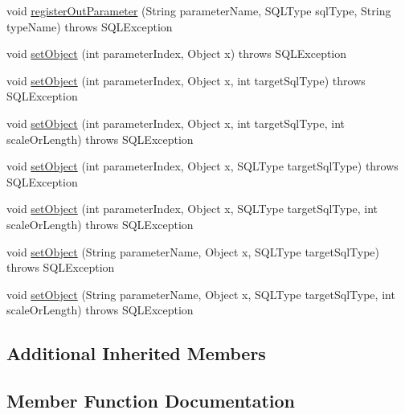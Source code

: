 \begin{DoxyCompactItemize}
\item 
void \mbox{\hyperlink{classcom_1_1mysql_1_1jdbc_1_1_j_d_b_c42_callable_statement_aabab9940d929ca7a5925da2f635a18d5}{register\+Out\+Parameter}} (String parameter\+Name, S\+Q\+L\+Type sql\+Type, String type\+Name)  throws S\+Q\+L\+Exception 
\item 
void \mbox{\hyperlink{classcom_1_1mysql_1_1jdbc_1_1_j_d_b_c42_callable_statement_a163f764b522b400e8e43a08a89d8e990}{set\+Object}} (int parameter\+Index, Object x)  throws S\+Q\+L\+Exception 
\item 
void \mbox{\hyperlink{classcom_1_1mysql_1_1jdbc_1_1_j_d_b_c42_callable_statement_ad1e1aea3f13d37fcd332e13a945f8bef}{set\+Object}} (int parameter\+Index, Object x, int target\+Sql\+Type)  throws S\+Q\+L\+Exception 
\item 
void \mbox{\hyperlink{classcom_1_1mysql_1_1jdbc_1_1_j_d_b_c42_callable_statement_a14c7b57ffb7ac7f89a51a70abdece688}{set\+Object}} (int parameter\+Index, Object x, int target\+Sql\+Type, int scale\+Or\+Length)  throws S\+Q\+L\+Exception 
\item 
void \mbox{\hyperlink{classcom_1_1mysql_1_1jdbc_1_1_j_d_b_c42_callable_statement_a7665e336f090f055b64c0b1925e9dde0}{set\+Object}} (int parameter\+Index, Object x, S\+Q\+L\+Type target\+Sql\+Type)  throws S\+Q\+L\+Exception 
\item 
void \mbox{\hyperlink{classcom_1_1mysql_1_1jdbc_1_1_j_d_b_c42_callable_statement_a3a5d6f49e57dd9a3c7c19d95e9ec2bb9}{set\+Object}} (int parameter\+Index, Object x, S\+Q\+L\+Type target\+Sql\+Type, int scale\+Or\+Length)  throws S\+Q\+L\+Exception 
\item 
void \mbox{\hyperlink{classcom_1_1mysql_1_1jdbc_1_1_j_d_b_c42_callable_statement_af9309be1334ed39ce0bc82c2bcaa3ab9}{set\+Object}} (String parameter\+Name, Object x, S\+Q\+L\+Type target\+Sql\+Type)  throws S\+Q\+L\+Exception 
\item 
void \mbox{\hyperlink{classcom_1_1mysql_1_1jdbc_1_1_j_d_b_c42_callable_statement_a51432b05b2c20b2c5f8d2f81ea3b3560}{set\+Object}} (String parameter\+Name, Object x, S\+Q\+L\+Type target\+Sql\+Type, int scale\+Or\+Length)  throws S\+Q\+L\+Exception 
\end{DoxyCompactItemize}
\subsection*{Additional Inherited Members}


\subsection{Member Function Documentation}
\mbox{\label{classcom_1_1mysql_1_1jdbc_1_1_j_d_b_c42_callable_statement_ac9e4f6e99edd718c7943741747c44e67}} 
